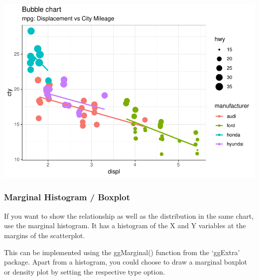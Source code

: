 \documentclass[a4paper]{article}
\begin{document}
\includegraphics{M24-ggplot2_Gallery_files/figure-latex/unnamed-chunk-7-1.pdf}
\newpage

\newpage

\subsubsection{Marginal Histogram /
Boxplot}\label{marginal-histogram-boxplot}

If you want to show the relationship as well as the distribution in the
same chart, use the marginal histogram. It has a histogram of the X and
Y variables at the margins of the scatterplot.

This can be implemented using the ggMarginal() function from the
`ggExtra' package. Apart from a histogram, you could choose to draw a
marginal boxplot or density plot by setting the respective type option.
\end{document}
